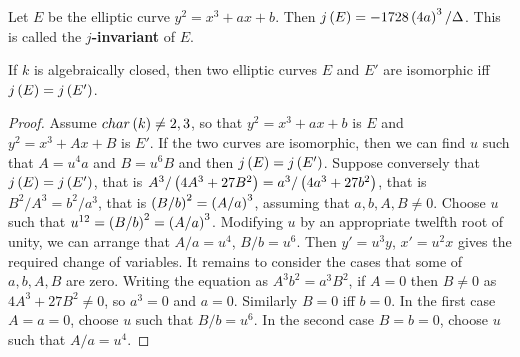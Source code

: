 
\begin{definition}
Let $ E $ be the elliptic curve $ y^2 = x^3 + ax + b $. Then $ j\left( E \right) = -1728\left( 4a \right)^3 / \Delta $. This is called the \textbf{$ j $-invariant} of $ E $.
\end{definition}

\begin{proposition}
If $ k $ is algebraically closed, then two elliptic curves $ E $ and $ E' $ are isomorphic iff $ j\left( E \right) = j\left( E' \right) $.
\end{proposition}

\begin{proof}
Assume $ char\left( k \right) \ne 2, 3 $, so that $ y^2 = x^3 + ax + b $ is $ E $ and $ y^2 = x^3 + Ax + B $ is $ E' $. If the two curves are isomorphic, then we can find $ u $ such that $ A = u^4a $ and $ B = u^6B $ and then $ j\left( E \right) = j\left( E' \right) $. Suppose conversely that $ j\left( E \right) = j\left( E' \right) $, that is $ A^3 / \left( 4A^3 + 27B^2 \right) = a^3 / \left( 4a^3 + 27b^2 \right) $, that is $ B^2 / A^3 = b^2 / a^3 $, that is $ \left( B / b \right)^2 = \left( A / a \right)^3 $, assuming that $ a, b, A, B \ne 0 $. Choose $ u $ such that $ u^{12} = \left( B / b \right)^2 = \left( A / a \right)^3 $. Modifying $ u $ by an appropriate twelfth root of unity, we can arrange that $ A / a = u^4 $, $ B / b = u^6 $. Then $ y' = u^3y $, $ x' = u^2x $ gives the required change of variables. It remains to consider the cases that some of $ a, b, A, B $ are zero. Writing the equation as $ A^3b^2 = a^3B^2 $, if $ A = 0 $ then $ B \ne 0 $ as $ 4A^3 + 27B^2 \ne 0 $, so $ a^3 = 0 $ and $ a = 0 $. Similarly $ B = 0 $ iff $ b = 0 $. In the first case $ A = a = 0 $, choose $ u $ such that $ B / b = u^6 $. In the second case $ B = b = 0 $, choose $ u $ such that $ A / a = u^4 $.
\end{proof}

